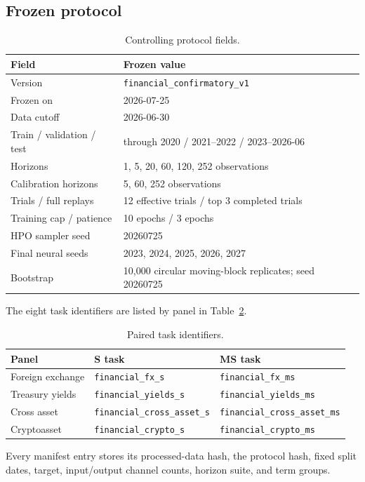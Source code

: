 \subsection{Frozen protocol}
\label{app:frozen-protocol}

\begin{table}[H]
\centering
\caption{Controlling protocol fields.}
\label{tab:frozen-protocol}
\begin{tabular}{ll}
\toprule
Field & Frozen value \\
\midrule
Version & \texttt{financial\_confirmatory\_v1} \\
Frozen on & 2026-07-25 \\
Data cutoff & 2026-06-30 \\
Train / validation / test & through 2020 / 2021--2022 / 2023--2026-06 \\
Horizons & 1, 5, 20, 60, 120, 252 observations \\
Calibration horizons & 5, 60, 252 observations \\
Trials / full replays & 12 effective trials / top 3 completed trials \\
Training cap / patience & 10 epochs / 3 epochs \\
HPO sampler seed & 20260725 \\
Final neural seeds & 2023, 2024, 2025, 2026, 2027 \\
Bootstrap & 10,000 circular moving-block replicates; seed 20260725 \\
\bottomrule
\end{tabular}
\end{table}

The eight task identifiers are listed by panel in Table~\ref{tab:task-identifiers}.
\begin{table}[H]
\centering
\caption{Paired task identifiers.}
\label{tab:task-identifiers}
\begin{tabular}{lll}
\toprule
Panel & S task & MS task \\
\midrule
Foreign exchange & \texttt{financial\_fx\_s} & \texttt{financial\_fx\_ms} \\
Treasury yields & \texttt{financial\_yields\_s} & \texttt{financial\_yields\_ms} \\
Cross asset & \texttt{financial\_cross\_asset\_s} & \texttt{financial\_cross\_asset\_ms} \\
Cryptoasset & \texttt{financial\_crypto\_s} & \texttt{financial\_crypto\_ms} \\
\bottomrule
\end{tabular}
\end{table}
Every manifest entry stores its processed-data hash, the protocol hash, fixed split dates, target, input/output channel counts, horizon suite, and term groups.

